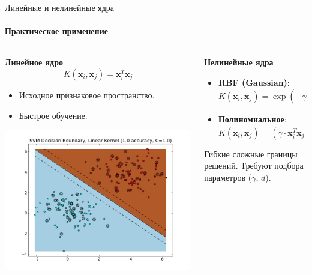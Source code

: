 \documentclass[notheorems, handout]{beamer}
\begin{document}
\begin{frame}{Линейные и нелинейные ядра}
	\framesubtitle{Практическое применение}
	\small

	\begin{columns}
		\begin{column}{0.5\textwidth}
			\textbf{Линейное ядро}
			\vspace{-3mm}
			\[
			K(\mathbf{x}_i, \mathbf{x}_j) = \mathbf{x}_i^T \mathbf{x}_j
			\]
			\vspace{-6mm}
			\begin{itemize}
				\item Исходное признаковое пространство.
				\item Быстрое обучение.
			\end{itemize}
			\includegraphics[width=\textwidth]{img/linear_kernal.jpg}
		\end{column}
		\begin{column}{0.5\textwidth}
			\textbf{Нелинейные ядра}
			\vspace{-3mm}
			\begin{itemize}
				\item \textbf{RBF (Gaussian)}:
			$K(\mathbf{x}_i, \mathbf{x}_j) = \exp(-\gamma ||\mathbf{x}_i - \mathbf{x}_j||^2)$
			\item \textbf{Полиномиальное}:
			$K(\mathbf{x}_i, \mathbf{x}_j) = (\gamma \cdot \mathbf{x}_i^T \mathbf{x}_j + r)^d$
			\end{itemize}
			Гибкие сложные границы решений. Требуют подбора параметров ($\gamma$, $d$).

\end{column}
\end{columns}
\end{frame}
\end{document}
